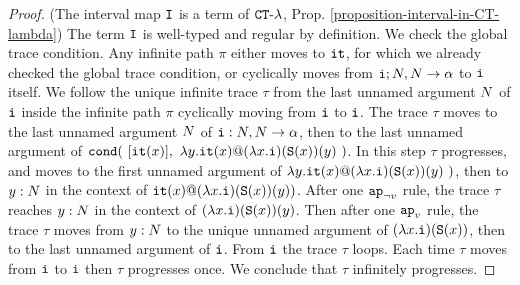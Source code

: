 \begin{proof}(The interval map ${\tt I}$ is a term of ${ {\tt CT}\mbox{-}\lambda}$, Prop. \ref{proposition-interval-in-CT-lambda})
The term ${\tt I}$ is well-typed and regular by definition. We check the global trace condition.
Any infinite path $\pi$ either moves to ${\tt it}$, 
for which we already checked the global trace condition,
or cyclically moves from ${\tt i}; {N},{N} \rightarrow \alpha$ to ${\tt i}$
itself. We follow the unique infinite 
trace $\tau$ from the last unnamed argument ${N}$ of ${\tt i}$ 
inside the infinite path $\pi$ cyclically moving from ${\tt i}$ to ${\tt i}$.
The trace $\tau$ moves to the last unnamed argument ${N}$ of  
${\tt i}:{N},{N} \rightarrow \alpha$, then to the last unnamed argument of
${\tt cond} (\ [{\tt it}(x)],  \  \lambda y.{\tt it}(x) @ (\lambda x.{\tt i})({\tt S}(x))(y) \ )$.
In this step $\tau$ progresses, and moves to 
the first unnamed argument of $\lambda y.{\tt it}(x) @ (\lambda x.{\tt i})({\tt S}(x))(y) \ )$,
then to $y:{N}$ in the context of ${\tt it}(x) @ (\lambda x.{\tt i})({\tt S}(x))(y))$.
After one $\apnotvar$ rule, the trace $\tau$ reaches $y:{N}$ in the context of
$(\lambda x.{\tt i})({\tt S}(x))(y)$.
Then after one $\apvar$ rule, 
the trace $\tau$ moves from $y:{N}$ to the unique unnamed argument of 
$(\lambda x.{\tt i})({\tt S}(x))$, 
then to the last unnamed argument of ${\tt i}$. 
From ${\tt i}$ the trace $\tau$ loops. 
Each time $\tau$ moves from ${\tt i}$ to ${\tt i}$
then $\tau$ progresses once. We conclude that $\tau$ infinitely progresses.
\end{proof}



